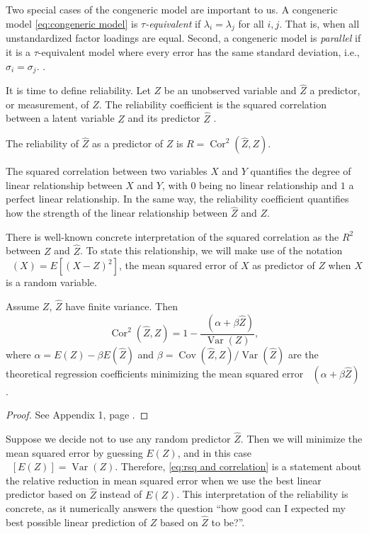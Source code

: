 \documentclass[twoside]{article}
\DeclareMathOperator{\Var}{Var}
\DeclareMathOperator{\Cor}{Cor}
\DeclareMathOperator{\Cov}{Cov}
\DeclareMathOperator{\MSE}{MSE_Z}
\begin{document}
Two special cases of the congeneric model are important to us. A congeneric model \eqref{eq:congeneric model} is \textit{$\tau$-equivalent} if $\lambda_{i}=\lambda_{j}$ for all $i,j$. That is, when all unstandardized factor loadings are equal. Second, a congeneric model is \textit{parallel} if it is a $\tau$-equivalent model where every error has the same standard deviation, i.e., $\sigma_i = \sigma_j$. \citep[][Section 2.13]{Lord1968-ax}. 

It is time to define reliability. Let $Z$ be an unobserved variable and $\hat{Z}$ a predictor, or measurement, of $Z$. The reliability coefficient is the squared correlation between a latent variable $Z$ and its predictor $\hat{Z}$ \citep[][p. 61]{Lord1968-ax}. 

\begin{defn}\label{defn:reliability} The reliability of $\hat{Z}$ as a predictor of $Z$ is $ R=\Cor^{2}(\hat{Z},Z)$.
\end{defn} 

The squared correlation between two variables $X$ and $Y$ quantifies the degree of linear relationship between $X$ and $Y$, with $0$ being no linear relationship and $1$ a perfect linear relationship. In the same way, the reliability coefficient quantifies how the strength of the linear relationship between $\hat{Z}$ and $Z$.

There is well-known concrete interpretation of the squared correlation as the $R^2$ between $Z$ and $\hat{Z}$. To state this relationship, we will make use of the notation $\MSE(X) = E[(X-Z)^2]$, the mean squared error of $X$ as predictor of $Z$ when $X$ is a random variable.

\begin{lem}
\label{lem:r^2 and correlation}Assume $Z$, $\hat{Z}$ have finite
variance. Then 
\begin{equation}
\Cor^{2}(\hat{Z},Z)=1-\frac{\MSE(\alpha+\beta\hat{Z})}{\Var(Z)},\label{eq:rsq and correlation}
\end{equation}
where $\alpha=E(Z)-\beta E(\hat{Z})$ and $\beta=\Cov(\hat{Z},Z)/\Var(\hat{Z})$ are the theoretical regression coefficients minimizing the mean squared error $\MSE(\alpha+\beta\hat{Z})$. 
\end{lem}
\begin{proof}
See Appendix 1, page \pageref{proof:r^2 and correlation}.
\end{proof}

Suppose we decide not to use any random predictor $\hat{Z}$. Then we will minimize the mean squared error by guessing $E(Z)$, and in this case $\MSE[E(Z)]=\Var(Z)$. Therefore, \cref{eq:rsq and correlation} is a statement about the relative reduction in mean squared error when we use the best linear predictor based on $\hat{Z}$ instead of $E(Z)$. This interpretation of the reliability is concrete, as it numerically answers the question ``how good can I expected my best possible linear prediction of $Z$ based on $\hat{Z}$ to be?''.
\end{document}
